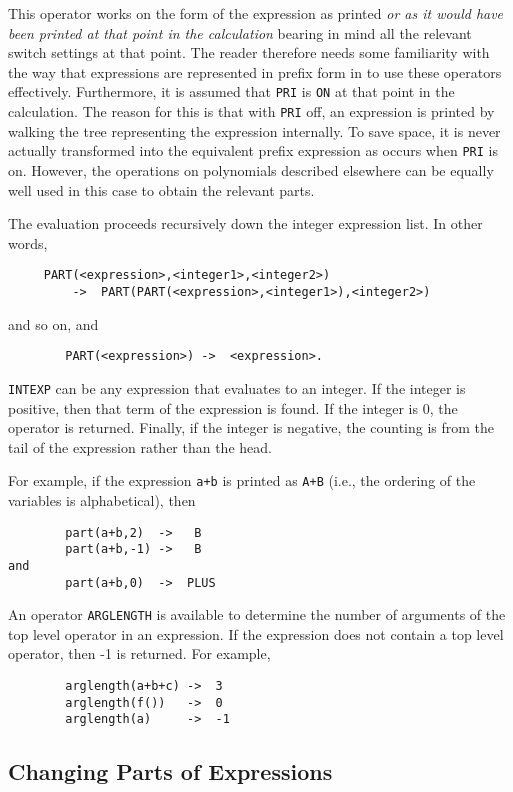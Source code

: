 This operator works on the form of the expression as printed {\em or as it
would have been printed at that point in the calculation} bearing in mind
all the relevant switch settings at that point.  The reader therefore
needs some familiarity with the way that expressions are represented in
prefix form in {\REDUCE} to use these operators effectively.  Furthermore,
it is assumed that {\tt PRI} is {\tt ON} at that point in the calculation.
The reason for this is that with {\tt PRI} off, an expression is printed
by walking the tree representing the expression internally.  To save
space, it is never actually transformed into the equivalent prefix
expression as occurs when {\tt PRI} is on.  However, the operations on
polynomials described elsewhere can be equally well used in this case to
obtain the relevant parts.

The evaluation proceeds recursively down the integer expression list. In
other words,
\begin{verbatim}
     PART(<expression>,<integer1>,<integer2>)
         ->  PART(PART(<expression>,<integer1>),<integer2>)
\end{verbatim}
 and so on, and
\begin{verbatim}
        PART(<expression>) ->  <expression>.
\end{verbatim}
{\tt INTEXP} can be any expression that evaluates to an integer.  If the
integer is positive, then that term of the expression is found.  If the
integer is 0, the operator is returned.  Finally, if the integer is
negative, the counting is from the tail of the expression rather than the
head.

For example, if the expression {\tt a+b} is printed as {\tt A+B} (i.e.,
the ordering of the variables is alphabetical), then
\begin{verbatim}
        part(a+b,2)  ->   B
        part(a+b,-1) ->   B
and
        part(a+b,0)  ->  PLUS
\end{verbatim}
An operator {\tt ARGLENGTH}  is available to determine
the number of arguments of the top level operator in an expression.  If
the expression does not contain a top level operator, then -1 is returned.
For example,
\begin{verbatim}
        arglength(a+b+c) ->  3
        arglength(f())   ->  0
        arglength(a)     ->  -1
\end{verbatim}

\subsection{Changing Parts of Expressions}

